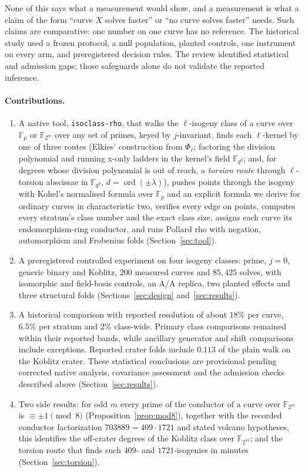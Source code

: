\documentclass[10pt,a4paper]{article}
\theoremstyle{remark}
\newcommand{\FF}{\mathbb{F}}
\newcommand{\code}[1]{\texttt{#1}}
\begin{document}
None of this says what a measurement would show, and a measurement is what a
claim of the form ``curve $X$ solves faster'' or ``no curve solves faster''
needs. Such claims are comparative: one number on one curve has no reference.
The historical study used a frozen protocol, a null population, planted
controls, one instrument on every arm, and preregistered decision rules.
The review identified statistical and admission gaps; those safeguards
alone do not validate the reported inference.

\paragraph{Contributions.}
\begin{enumerate}
\item A native tool, \code{isoclass-rho}, that walks the $\ell$-isogeny class
  of a curve over $\FF_p$ or $\FF_{2^m}$ over any set of primes, keyed by
  $j$-invariant, finds each $\ell$-kernel by one of three routes (Elkies'
  construction from $\Phi_\ell$; factoring the division polynomial and
  running x-only ladders in the kernel's field $\FF_{q^d}$; and, for degrees
  whose division polynomial is out of reach, a \emph{torsion route} through
  $\ell$-torsion abscissae in $\FF_{q^d}$, $d = \operatorname{ord}(\pm\lambda)$),
  pushes points through the isogeny with Kohel's normalised formula over
  $\FF_p$ and an explicit formula we derive for ordinary curves in
  characteristic two, verifies every edge on points, computes every stratum's
  class number and the exact class size, assigns each curve its
  endomorphism-ring conductor, and runs Pollard rho with negation,
  automorphism and Frobenius folds (Section~\ref{sec:tool}).
\item A preregistered controlled experiment on four isogeny classes: prime,
  $j = 0$, generic binary and Koblitz, $200$ measured curves and $85{,}425$
  solves, with isomorphic and field-basis controls, an A/A replica, two
  planted effects and three structural folds (Sections~\ref{sec:design}
  and~\ref{sec:results}).
\item A historical comparison with reported resolution of about $18\%$
  per curve, $6.5\%$ per stratum and $2\%$ class-wide. Primary class
  comparisons remained within their reported bands, while ancillary
  generator and shift comparisons include exceptions. Reported crater
  folds include $0.113$ of the plain walk on the Koblitz crater.
  These statistical conclusions are provisional pending corrected native
  analysis, covariance assessment and the admission checks described above
  (Section~\ref{sec:results}).
\item Two side results: for odd $m$ every prime of the conductor of a curve
  over $\FF_{2^m}$ is $\equiv \pm 1 \pmod 8$ (Proposition~\ref{prop:mod8}),
  together with the recorded conductor factorization $703889=409\cdot1721$
  and stated volcano hypotheses, this identifies the off-crater degrees
  of the Koblitz class over $\FF_{2^{41}}$; and the torsion route that finds such
  $409$- and $1721$-isogenies in minutes (Section~\ref{sec:torsion}).
\end{enumerate}
\end{document}

